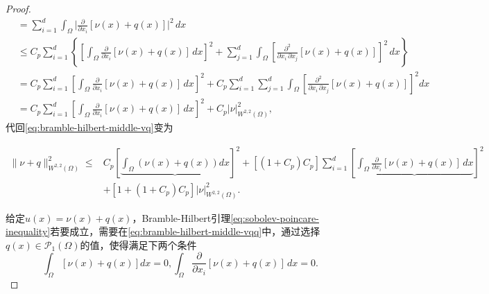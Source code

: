 \begin{proof}
\begin{equation*}
\begin{split}
    &= \sum_{i=1}^{d} \int_{\Omega} \Big| \frac{\partial}{\partial x_i} \left[ \nu(x) + q(x) \right] \Big|^2 \, dx\\
    & \le C_p \sum_{i=1}^{d} \left\{
    \left[
    \int_{\Omega} \frac{\partial}{\partial x_i} \left[ \nu(x) + q(x) \right]  \, dx
    \right]^2
    + \sum_{j=1}^{d} \int_{\Omega}
    \left[
    \frac{
    \partial^2
    }{
    \partial x_i \, \partial x_j
    }
    \left[ \nu(x) + q(x) \right]
    \right]^2 \, dx
    \right\}\\
    &= C_p \sum_{i=1}^{d} \left[
    \int_{\Omega} \frac{
    \partial
    }{
    \partial x_i
    }
    \left[ \nu(x) + q(x) \right] \, dx
    \right]^2
    + C_p \sum_{i=1}^{d} \sum_{j=1}^{d} \int_{\Omega}
    \left[
    \frac{
    \partial^2
    }{
    \partial x_i \, \partial x_j
    }
    \left[ \nu(x) + q(x) \right]
    \right]^2 dx \\
    &= C_p \sum_{i=1}^{d} \left[
    \int_{\Omega} \frac{
    \partial
    }{
    \partial x_i
    }
    \left[ \nu(x) + q(x) \right] \, dx
    \right]^2
    + C_p \big| \nu \big|^2_{W^{2,2}(\Omega)},
  \end{split}
\end{equation*}
代回\eqref{eq:bramble-hilbert-middle-vq}变为

\begin{equation}
  \label{eq:bramble-hilbert-middle-vqq}
  \begin{split}
    \big\| \nu + q \big\|_{W^{2,2}(\Omega)}^2 \le & C_p \left[ \underbrace{
    \int_{\Omega} \left( \nu(x) + q(x) \right) dx
    }
    \right]^2
    + \left[ \left( 1 + C_p \right) C_p \right] \sum_{i=1}^{d} \left[
    \underbrace{
    \int_{\Omega} \frac{
    \partial
    }{
    \partial x_i
    }
    \left[ \nu(x) + q(x) \right] \, dx
    }
    \right]^2 \\
    &+ \left[ 1 + \left( 1 + C_p \right) C_p \right]
    \big| \nu \big|^2_{W^{2,2}(\Omega)}.
  \end{split}
\end{equation}

给定$u(x) = \nu(x) + q(x) $，Bramble-Hilbert引理\eqref{eq:sobolev-poincare-inequality}若要成立，需要在\eqref{eq:bramble-hilbert-middle-vqq}中，通过选择$q(x) \in \mathcal{P}_{1}(\Omega)$的值，使得满足下两个条件
\begin{subequations}
  \begin{equation}
    \label{eq:bramble-hilbert-middle-q0}
    \int_{\Omega} \left[ \nu(x) + q(x) \right] dx=0,
  \end{equation}
  \begin{equation}
    \label{eq:bramble-hilbert-middle-q1}
    \int_{\Omega} \frac{
    \partial
    }{
    \partial x_i
    }
    \left[ \nu(x) + q(x) \right] \, dx=0.
  \end{equation}
\end{subequations}


\end{proof}
